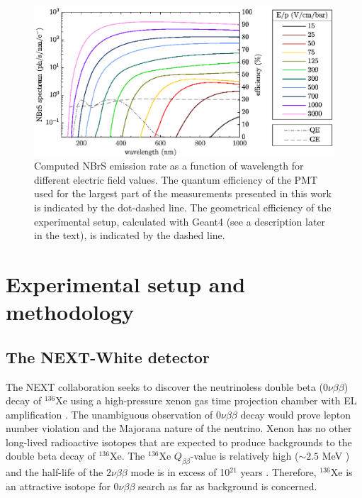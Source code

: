 \documentclass[%
 reprint,
superscriptaddress,
 amsmath,amssymb,
 aps,
]{revtex4-2}
\begin{document}
\begin{figure}[t!]
\includegraphics{Fig1.eps}
\caption{\label{fig:spectrum}Computed NBrS emission rate as a function of wavelength for different electric field values. The quantum efficiency of the PMT used for the largest part of the measurements presented in this work is indicated by the dot-dashed line. The geometrical efficiency of the experimental setup, calculated with Geant4 (see a description later in the text), is indicated by the dashed line.}
\end{figure}


\section{\label{sec:setup}Experimental setup and methodology}
\subsection{\label{subsec:NEW}The NEXT-White detector}

The NEXT collaboration seeks to discover the neutrinoless double beta ($0\nu\beta\beta$) decay of $^{136}$Xe using a high-pressure xenon gas time projection chamber with EL amplification \cite{a}. The unambiguous observation of $0\nu\beta\beta$ decay would prove lepton number violation and the Majorana nature of the neutrino. Xenon has no other long-lived radioactive isotopes that are expected to produce backgrounds to the double beta decay of $^{136}$Xe. The $^{136}$Xe $Q_{\beta\beta}$-value is relatively high ($\sim 2.5$ MeV \cite{b}) and the half-life of the $2\nu\beta\beta$ mode is in excess of 10$^{21}$ years \cite{c,d}. Therefore, $^{136}$Xe is an attractive isotope for $0\nu\beta\beta$ search as far as background is concerned.
\end{document}
